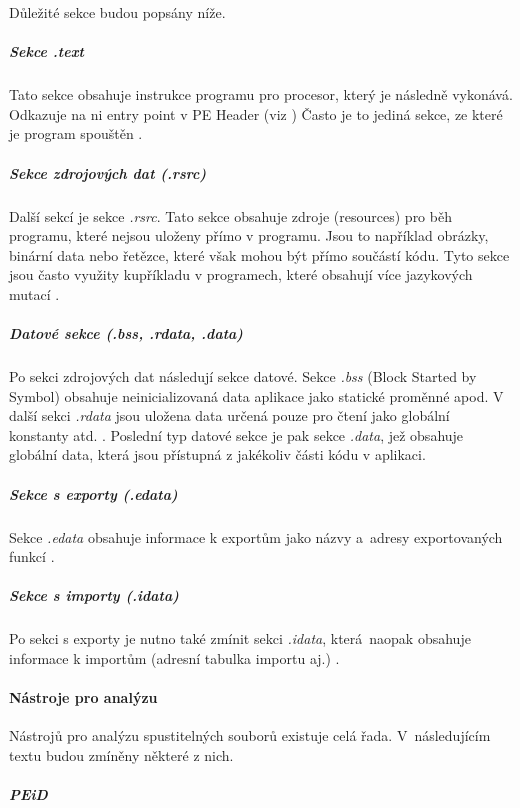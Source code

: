 Důležité sekce budou popsány níže.

\subparagraph*{Sekce .text}
Tato sekce obsahuje instrukce programu pro procesor, který je následně vykonává. Odkazuje na ni entry point v PE Header (viz \label{peheader_entrypoint}) Často je to jediná sekce, ze které je program spouštěn \cite{sikorski2012practical}.

\subparagraph*{Sekce zdrojových dat (.rsrc)}

Další sekcí je sekce \emph{.rsrc}. Tato sekce obsahuje zdroje (resources) pro běh programu, které nejsou uloženy přímo v programu. Jsou to například obrázky, binární data nebo řetězce, které však mohou být přímo součástí kódu. Tyto sekce jsou často využity kupříkladu v programech, které obsahují více jazykových mutací \cite{sikorski2012practical}.

\subparagraph*{Datové sekce (.bss, .rdata, .data)}

Po sekci zdrojových dat následují sekce datové. Sekce \emph{.bss} (Block Started by Symbol) obsahuje neinicializovaná data aplikace jako statické proměnné apod. V další sekci \emph{.rdata} jsou uložena data určená pouze pro čtení jako globální konstanty atd. \cite{infosecinstitute_pe}. Poslední typ datové sekce je pak sekce \emph{.data}, jež obsahuje globální data, která jsou přístupná z jakékoliv části kódu v aplikaci. \cite{sikorski2012practical}

\subparagraph*{Sekce s exporty (.edata)}

Sekce \emph{.edata} obsahuje informace k exportům jako názvy a~adresy exportovaných funkcí \cite{infosecinstitute_pe}.

\subparagraph*{Sekce s importy (.idata)}

Po sekci s exporty je nutno také zmínit sekci \emph{.idata}, která~naopak obsahuje informace k importům (adresní tabulka importu aj.) \cite{infosecinstitute_pe}. 


\paragraph*{Nástroje pro analýzu}

Nástrojů pro analýzu spustitelných souborů existuje celá řada. V~následujícím textu budou zmíněny některé z nich. 

\subparagraph*{PEiD}

